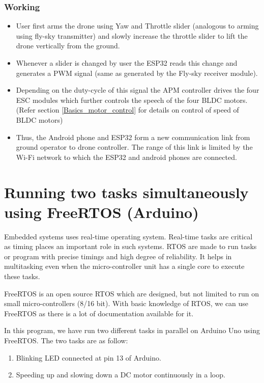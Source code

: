 \subsubsection{Working}
\begin{itemize}
    \item User first arms the drone using Yaw and Throttle slider (analogous to arming using fly-sky transmitter) and slowly increase the throttle slider to lift the drone vertically from the ground.
    \item Whenever a slider is changed by user the ESP32 reads this change and generates a PWM signal (same as generated by the Fly-sky receiver module).
    \item Depending on the duty-cycle of this signal the APM controller drives the four ESC modules which further controls the speech of the four BLDC motors. (Refer section \ref{Basics_motor_control} for details on control of speed of BLDC motors)
    \item Thus, the Android phone and ESP32 form a new communication link from ground operator to drone controller. The range of this link is limited by the Wi-Fi network to which the ESP32 and android phones are connected.
\end{itemize}

\newpage

\section{Running two tasks simultaneously using FreeRTOS (Arduino) }
Embedded systems uses real-time operating system. Real-time tasks are critical as timing places an important role in such systems. RTOS are made to run tasks or program with precise timings and high degree of reliability. It helps in multitasking even when the micro-controller unit has a single core to execute these tasks.

FreeRTOS is an open source RTOS which are designed, but not limited to run on small micro-controllers (8/16 bit). With basic knowledge of RTOS, we can use FreeRTOS as there is a lot of documentation available for it.

In this program, we have run two different tasks in parallel on Arduino Uno using FreeRTOS. The two tasks are as follow:
\begin{enumerate}
    \item Blinking LED connected at pin 13 of Arduino.
    \item Speeding up and slowing down a DC motor continuously in a loop.
\end{enumerate}

